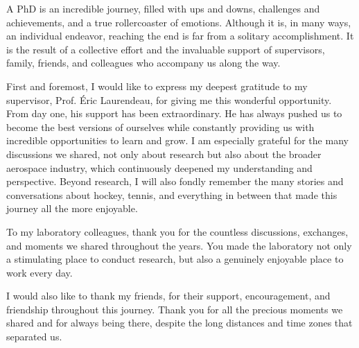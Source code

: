 {





%
A PhD is an incredible journey, filled with ups and downs, challenges and achievements, and a true rollercoaster of emotions. Although it is, in many ways, an individual endeavor, reaching the end is far from a solitary accomplishment. It is the result of a collective effort and the invaluable support of supervisors, family, friends, and colleagues who accompany us along the way.

First and foremost, I would like to express my deepest gratitude to my supervisor, Prof. Éric Laurendeau, for giving me this wonderful opportunity. From day one, his support has been extraordinary. He has always pushed us to become the best versions of ourselves while constantly providing us with incredible opportunities to learn and grow. I am especially grateful for the many discussions we shared, not only about research but also about the broader aerospace industry, which continuously deepened my understanding and perspective. Beyond research, I will also fondly remember the many stories and conversations about hockey, tennis, and everything in between that made this journey all the more enjoyable.

To my laboratory colleagues, thank you for the countless discussions, exchanges, and moments we shared throughout the years. You made the laboratory not only a stimulating place to conduct research, but also a genuinely enjoyable place to work every day.

I would also like to thank my friends, for their support, encouragement, and friendship throughout this journey. Thank you for all the precious moments we shared and for always being there, despite the long distances and time zones that separated us.

}
